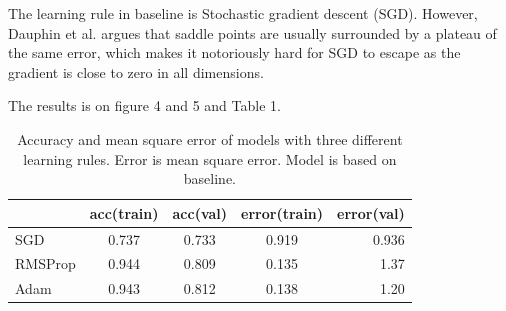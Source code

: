 \documentclass{article}
\begin{document}
The learning rule in baseline is Stochastic gradient descent (SGD). However, Dauphin et al. argues that saddle points are usually surrounded by a plateau of the same error, which makes it notoriously hard for SGD to escape as the gradient is close to zero in all dimensions.

The results is on figure 4 and 5 and Table 1.

\begin{table}[h]
\vskip 3mm
\begin{center}
\begin{small}
\begin{sc}
\begin{tabular}{lcccr}
\hline
\abovespace\belowspace
&acc(train) & acc(val) & error(train) & error(val) \\
\hline
\abovespace
SGD     & 0.737      & 0.733           & 0.919        & 0.936             \\ \hline
RMSProp & 0.944      & 0.809           & 0.135        & 1.37              \\ \hline
Adam    & 0.943      & 0.812           & 0.138        & 1.20              \\
\hline
\end{tabular}
\end{sc}
\end{small}
\caption{Accuracy and mean square error of models with three different learning rules. Error is mean square error. Model is based on baseline.}
\label{tab:sample-table}
\end{center}
\vskip -3mm
\end{table}
\end{document}

